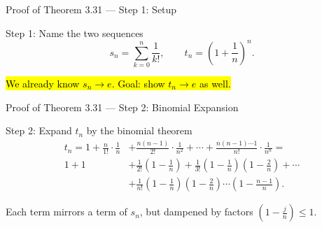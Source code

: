 \documentclass[aspectratio=169,12pt,t]{beamer}
\begin{document}
{\begin{frame}{Proof of Theorem 3.31 --- Step 1: Setup}
  \begin{proofblock}{Step 1: Name the two sequences}
    \[
      s_n = \sum_{k=0}^{n} \frac{1}{k!}, \qquad
      t_n = \left(1 + \frac{1}{n}\right)^{n}.
    \]
  \end{proofblock}

  \vspace{0.5em}
  \hl{We already know $s_n \to e$. \quad Goal: show $t_n \to e$ as well.}

\end{frame}

\begin{frame}{Proof of Theorem 3.31 --- Step 2: Binomial Expansion}
  \begin{proofblock}{Step 2: Expand $t_n$ by the binomial theorem}
    \begin{align*}
      t_n = 1 + \frac{n}{1!} \cdot \frac{1}{n} &+ \frac{n (n-1)}{2!} \cdot \frac{1}{n^2}
              + \cdots + \frac{n (n-1) \cdots 1}{n!} \cdot \frac{1}{n^n} = \\[2pt]
            1 + 1 &+ \frac{1}{2!}\left(1 - \frac{1}{n}\right)
             + \frac{1}{3!}\left(1 - \frac{1}{n}\right)\left(1 - \frac{2}{n}\right) + \cdots\\[2pt]
           &+ \frac{1}{n!}\left(1 - \frac{1}{n}\right)\left(1 - \frac{2}{n}\right)
             \cdots\left(1 - \frac{n-1}{n}\right).
    \end{align*}
  \end{proofblock}

  \vspace{0.4em}
  \begin{hlbox}
  Each term mirrors a term of $s_n$, but \alert{dampened} by factors
  $\left(1 - \tfrac{j}{n}\right) \leq 1$.
  \end{hlbox}


\end{frame}}
\end{document}
